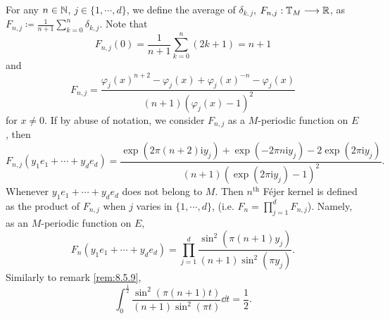 \begin{remark}
    For any $n \in \mathbb{N}$, $j \in \{1,\cdots,d\}$, we define the average of $\delta_{k,j}$, $F_{n,j} : \mathbb{T}_{M} \longrightarrow \mathbb{R}$, as $F_{n,j} \coloneq \frac{1}{n + 1} \sum_{k=0}^{n} \delta_{k,j}$.
    Note that
    $$F_{n,j} (0) = \frac{1}{n + 1} \sum_{k=0}^{n} (2k + 1) = n + 1$$
    and
    $$F_{n,j} = \frac{\varphi_{j}(x)^{n+2} - \varphi_{j}(x) + \varphi_{j}(x)^{-n} - \varphi_{j}(x)}{(n+1)(\varphi_{j}(x) - 1)^2}$$
    for $x \neq 0$.
    If by abuse of notation, we consider $F_{n,j}$ as a $M$-periodic function on $E$, then
    $$F_{n,j}(y_1 e_1 + \cdots + y_d e_d) = \frac{\exp(2 \pi (n + 2) \mathrm{i} y_{j}) + \exp (-2\pi n \mathrm{i} y_{j}) - 2 \exp (2\pi \mathrm{i} y_{j})}{(n+1)(\exp(2 \pi \mathrm{i} y_{j}) - 1)^2}.$$
    Whenever $y_1 e_1 + \cdots + y_d e_d$ does not belong to $M$.
    Then $n^\text{th}$ F\'ejer kernel is defined as the product of $F_{n,j}$ when $j$ varies in $\{1,\cdots,d\}$, (i.e. $F_n = \prod_{j=1}^{d} F_{n,j}$).
    Namely, as an $M$-periodic function on $E$,
    $$F_n(y_1 e_1 + \cdots + y_d e_d) = \prod_{j=1}^{d}\frac{\sin^2(\pi (n + 1)y_{j})}{(n+1)\sin^2(\pi y_{j})}.$$
    Similarly to remark \ref{rem:8.5.9},
    $$\int_{0}^{\frac{1}{2}} \frac{\sin^2(\pi(n+1)t)}{(n+1)\sin^2(\pi t)} \dd t = \frac{1}{2}.$$
\end{remark}


